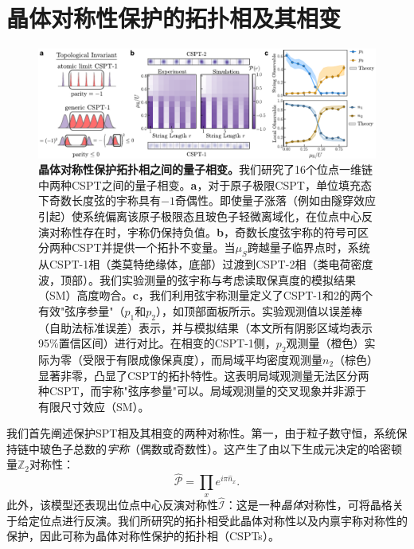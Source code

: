 \documentclass[preprint,superscriptaddress,floatfix,nofootinbib]{revtex4-2}
\begin{document}
\section{晶体对称性保护的拓扑相及其相变} \label{sec:CSPT-transitions}
\begin{figure}
    \centering
    \includegraphics[width=\textwidth]{figures/Fig_CSPT_ground.pdf}
    \caption{\textbf{晶体对称性保护拓扑相之间的量子相变。}我们研究了16个位点一维链中两种CSPT之间的量子相变。\textbf{a}，对于原子极限CSPT，单位填充态下奇数长度弦的宇称具有$-1$奇偶性。即使量子涨落（例如由隧穿效应引起）使系统偏离该原子极限态且玻色子轻微离域化，在位点中心反演对称性存在时，宇称仍保持负值。\textbf{b}，奇数长度弦宇称的符号可区分两种CSPT并提供一个拓扑不变量。当$\mu_S$跨越量子临界点时，系统从CSPT-1相（类莫特绝缘体，底部）过渡到CSPT-2相（类电荷密度波，顶部）。我们实验测量的弦宇称与考虑读取保真度的模拟结果（SM）高度吻合。\textbf{c}，我们利用弦宇称测量定义了CSPT-1和2的两个有效"弦序参量"（$p_1$和$p_2$），如顶部面板所示。实验观测值以误差棒（自助法标准误差）表示，并与模拟结果（本文所有阴影区域均表示95\%置信区间）进行对比。在相变的CSPT-1侧，$p_2$观测量（橙色）实际为零（受限于有限成像保真度），而局域平均密度观测量$n_2$（棕色）显著非零，凸显了CSPT的拓扑特性。这表明局域观测量无法区分两种CSPT，而宇称"弦序参量"可以。局域观测量的交叉现象并非源于有限尺寸效应（SM）。}
    \label{fig: CSPT_ground}
\end{figure}
我们首先阐述保护SPT相及其相变的两种对称性。第一，由于粒子数守恒，系统保持链中玻色子总数的\textit{宇称}（偶数或奇数性）。这产生了由以下生成元决定的哈密顿量$\mathbb{Z}_2$对称性：
\begin{equation} \label{eq: parity-generator}
 \hat{\mathcal{P}} = \prod_{x} e^{i \pi \hat{n}_x}   .
\end{equation}
此外，该模型还表现出位点中心反演对称性$\hat{\mathcal I}$：这是一种\textit{晶体}对称性，可将晶格关于给定位点进行反演。我们所研究的拓扑相受此晶体对称性以及内禀宇称对称性的保护，因此可称为晶体对称性保护的拓扑相（CSPTs）\cite{Fu11, Turner10inversion, Hughes11, Fuji2015, Song17}。
\end{document}

